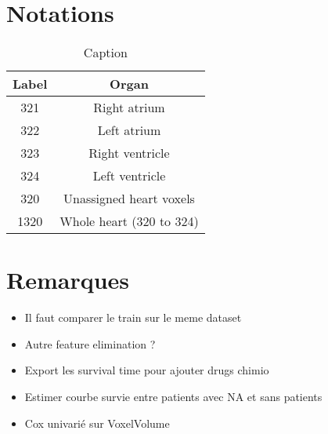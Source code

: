 \documentclass{article}
\begin{document}
\clearpage

\section{Notations}

\begin{table}[h]
    \centering
    \begin{tabular}{|c|c|}
        \hline
        Label  & Organ         \\ \hline
        321    & Right atrium  \\ \hline
        322    & Left atrium   \\ \hline
        323    & Right ventricle \\ \hline
        324    & Left ventricle \\ \hline
        320    & Unassigned heart voxels \\ \hline
        1320   & Whole heart (320 to 324) \\ \hline
    \end{tabular}
    \caption{Caption}
    \label{tab:my_label}
\end{table}

\section{Remarques}

\begin{itemize}
    \item Il faut comparer le train sur le meme dataset
    \item Autre feature elimination ?
    \item Export les survival time pour ajouter drugs chimio
    \item Estimer courbe survie entre patients avec NA et sans patients
    \item Cox univarié sur VoxelVolume
\end{itemize}
\end{document}
